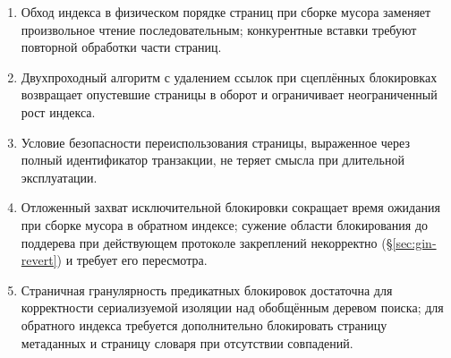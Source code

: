 \begin{enumerate}
\item Обход индекса в физическом порядке страниц при сборке мусора заменяет
      произвольное чтение последовательным; конкурентные вставки требуют
      повторной обработки части страниц.
\item Двухпроходный алгоритм с удалением ссылок при сцеплённых блокировках
      возвращает опустевшие страницы в оборот и ограничивает неограниченный рост
      индекса.
\item Условие безопасности переиспользования страницы, выраженное через полный
      идентификатор транзакции, не теряет смысла при длительной эксплуатации.
\item Отложенный захват исключительной блокировки сокращает время ожидания при
      сборке мусора в обратном индексе; сужение области блокирования до
      поддерева при действующем протоколе закреплений некорректно
      (§\ref{sec:gin-revert}) и требует его пересмотра.
\item Страничная гранулярность предикатных блокировок достаточна для
      корректности сериализуемой изоляции над обобщённым деревом поиска;
      для обратного индекса требуется дополнительно блокировать страницу
      метаданных и страницу словаря при отсутствии совпадений.
\end{enumerate}
